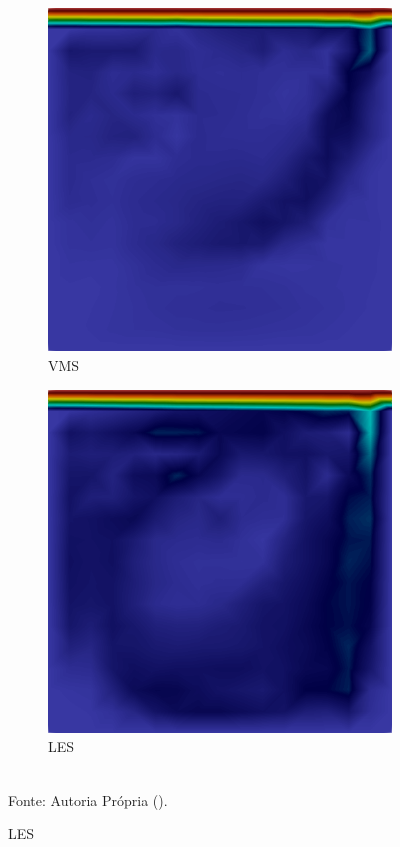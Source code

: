 \begin{figure}[h!]
\begin{subfigure}{0.32\textwidth}
        \includegraphics[width=\linewidth]{Figuras/cavity3D/VMS.png}
        \caption{VMS}
    \end{subfigure}
    \begin{subfigure}{0.32\textwidth}
        \centering
        \includegraphics[width=\linewidth]{Figuras/cavity3D/LES.png}
        \caption{LES}
    \end{subfigure}
    \\Fonte: Autoria Própria (\the\year).
    \label{fig:cavity-results5}
\end{figure}

